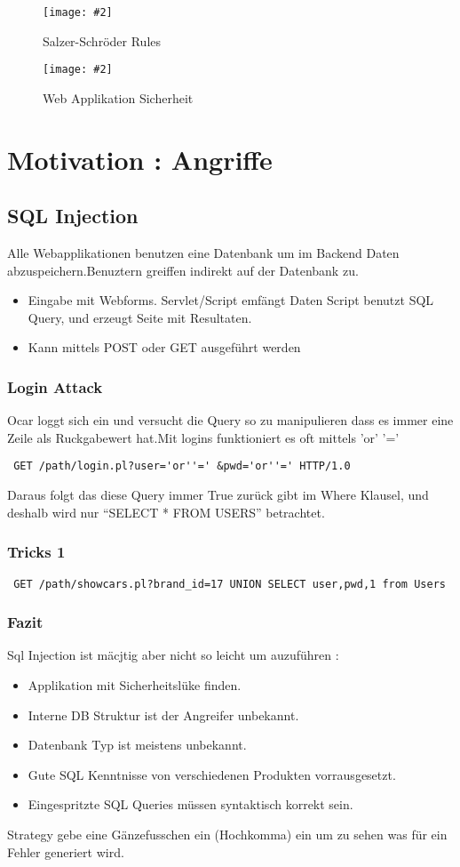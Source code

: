 \documentclass[a4paper,10pt]{scrreprt}
\newcommand{\pic}[2][figure]{\begin{figure}[h]
 \centering
 \texttt{[image: \#2]}
 \caption{#1}
\end{figure}
}
\begin{document}
\pic[Salzer-Schröder Rules]{ss-sw.png}
\pic[Web Applikation Sicherheit]{was.png}

\section{Motivation : Angriffe}

\subsection{SQL Injection}
Alle Webapplikationen benutzen eine Datenbank um im Backend Daten abzuspeichern.Benuztern greiffen indirekt auf der 
Datenbank zu.
\begin{itemize}
 \item Eingabe mit Webforms.
 \subitem Servlet/Script emfängt Daten
 \subitem Script benutzt SQL Query, und erzeugt Seite mit Resultaten.
 \item Kann mittels POST oder GET ausgeführt werden
\end{itemize}

\subsubsection{Login Attack}
Ocar loggt sich ein und versucht die Query so zu manipulieren dass es immer eine Zeile als Ruckgabewert hat.Mit logins 
funktioniert es oft mittels 'or' '='\\
\begin{verbatim}
 GET /path/login.pl?user='or''=' &pwd='or''=' HTTP/1.0
\end{verbatim}
Daraus folgt das diese Query immer True zurück gibt im Where Klausel, und deshalb wird nur ``SELECT * FROM USERS'' 
betrachtet.

\subsubsection{Tricks 1}
\begin{verbatim}
 GET /path/showcars.pl?brand_id=17 UNION SELECT user,pwd,1 from Users
\end{verbatim}

\subsubsection{Fazit}
Sql Injection ist mäcjtig aber nicht so leicht um auzuführen :
\begin{itemize}
 \item Applikation mit Sicherheitslüke finden.
 \item Interne DB Struktur ist der Angreifer unbekannt.
 \item Datenbank Typ ist meistens unbekannt.
 \item Gute SQL Kenntnisse von verschiedenen Produkten vorrausgesetzt.
 \item Eingespritzte SQL Queries müssen syntaktisch korrekt sein.
\end{itemize}
Strategy gebe eine Gänzefusschen ein (Hochkomma) ein um zu sehen was für ein Fehler generiert wird.
\end{document}
